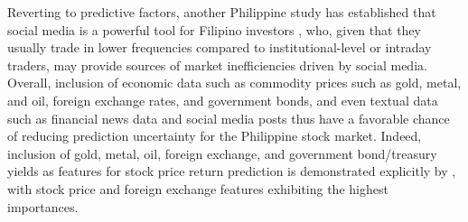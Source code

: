 \documentclass[stu,floatsintext]{apa7}
\begin{document}
Reverting to predictive factors, another Philippine study has established that social media is a powerful tool for Filipino investors \parencite{casao2025social}, who, given that they usually trade in lower frequencies compared to institutional-level or intraday traders, may provide sources of market inefficiencies driven by social media. Overall, inclusion of economic data such as commodity prices such as gold, metal, and oil, foreign exchange rates, and government bonds, and even textual data such as financial news data and social media posts thus have a favorable chance of reducing prediction uncertainty for the Philippine stock market. Indeed, inclusion of gold, metal, oil, foreign exchange, and government bond/treasury yields as features for stock price return prediction is demonstrated explicitly by \textcite{lohrmann2018classification}, with stock price and foreign exchange features exhibiting the highest importances.
\end{document}
